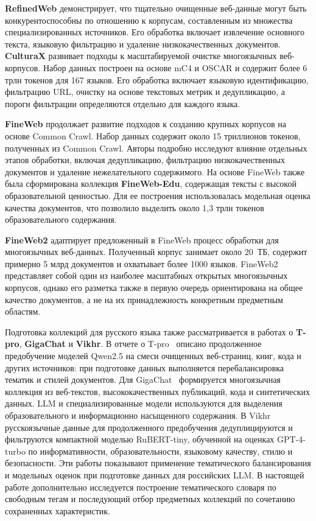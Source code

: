 \documentclass[12pt,a4paper]{article}
\begin{document}
\textbf{RefinedWeb} \cite{refinedweb} демонстрирует, что тщательно очищенные веб-данные могут 
быть конкурентоспособны по отношению к корпусам, составленным из множества специализированных источников. 
Его обработка включает извлечение основного текста, языковую фильтрацию и удаление низкокачественных документов.
\textbf{CulturaX} \cite{culturax} развивает подходы к масштабируемой очистке многоязычных веб-корпусов.
Набор данных построен на основе mC4 и OSCAR и содержит более 6 трлн токенов для 167 языков. 
Его обработка включает языковую идентификацию, фильтрацию URL, очистку на основе текстовых метрик и дедупликацию, 
а пороги фильтрации определяются отдельно для каждого языка. 

\textbf{FineWeb} \cite{fineweb} продолжает развитие подходов к созданию крупных корпусов на основе Common Crawl.
Набор данных содержит около 15 триллионов токенов, полученных из Common Crawl.
Авторы подробно исследуют влияние отдельных этапов обработки, включая дедупликацию,
фильтрацию низкокачественных документов и удаление нежелательного содержимого.
На основе FineWeb также была сформирована коллекция \textbf{FineWeb-Edu},
содержащая тексты с высокой образовательной ценностью.
Для ее построения использовалась модельная оценка качества документов,
что позволило выделить около 1,3 трлн токенов образовательного содержания.

\textbf{FineWeb2} \cite{fineweb2} адаптирует предложенный в FineWeb процесс обработки
для многоязычных веб-данных.
Полученный корпус занимает около 20~ТБ, содержит примерно 5 млрд документов и охватывает более 1000 языков.
FineWeb2 представляет собой один из наиболее масштабных открытых многоязычных корпусов,
однако его разметка также в первую очередь ориентирована на общее качество документов,
а не на их принадлежность конкретным предметным областям.

Подготовка коллекций для русского языка также рассматривается в работах
о \textbf{T-pro}, \textbf{GigaChat} и \textbf{Vikhr}.
В отчете о T-pro~\cite{tpro} описано продолженное предобучение моделей Qwen2.5
на смеси очищенных веб-страниц, книг, кода и других источников: 
при подготовке данных выполняется перебалансировка тематик и стилей документов.
Для GigaChat~\cite{gigachat} формируется многоязычная коллекция из веб-текстов,
высококачественных публикаций, кода и синтетических данных.
LLM и специализированные модели используются для выделения образовательного
и информационно насыщенного содержания.
В Vikhr~\cite{vikhr} русскоязычные данные для продолженного предобучения
дедуплицируются и фильтруются компактной моделью RuBERT-tiny,
обученной на оценках GPT-4-turbo по информативности, образовательности,
языковому качеству, стилю и безопасности.
Эти работы показывают применение тематического балансирования и модельных оценок
при подготовке данных для российских LLM.
В настоящей работе дополнительно исследуется построение тематического словаря
по свободным тегам и последующий отбор предметных коллекций по сочетанию сохраненных характеристик.
\end{document}

